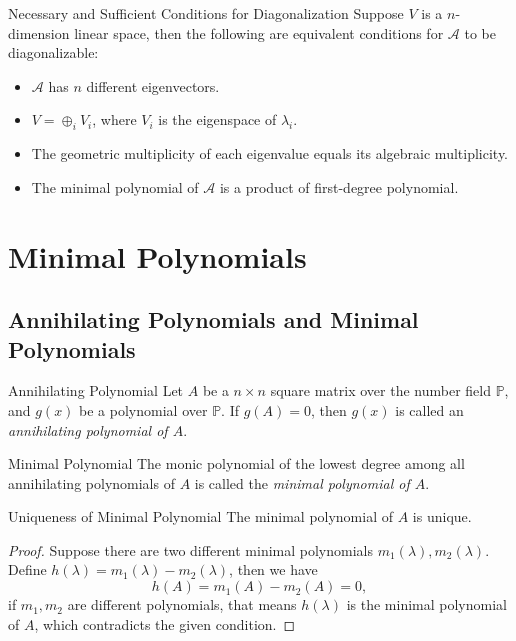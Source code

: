 \begin{proposition}{Necessary and Sufficient Conditions for Diagonalization}{}
  Suppose $V$ is a $n$-dimension linear space,
  then the following are equivalent conditions for $\mathcal{A}$ to be diagonalizable:
  \begin{itemize}
  \item $\mathcal{A}$ has $n$ different eigenvectors.
  \item $V = \oplus_i V_i$, where $V_i$ is the eigenspace of $\lambda_i$.
  \item The geometric multiplicity of each eigenvalue equals its algebraic multiplicity.
  \item The minimal polynomial of $\mathcal{A}$ is a product of first-degree polynomial.
  \end{itemize}
\end{proposition}

\section{Minimal Polynomials}

\subsection{Annihilating Polynomials and Minimal Polynomials}

\begin{definition}{Annihilating Polynomial}{}
  Let $A$ be a $n\times n$ square matrix over the number field $\mathbb{P}$,
  and $g(x)$ be a polynomial over $\mathbb{P}$.
  If $g(A) = 0$, then $g(x)$ is called an \emph{annihilating polynomial of $A$}.
\end{definition}

\begin{definition}{Minimal Polynomial}{}
  The monic polynomial of the lowest degree among all annihilating polynomials
  of $A$ is called the \emph{minimal polynomial of $A$}.
\end{definition}

\begin{proposition}{Uniqueness of Minimal Polynomial}{}
  The minimal polynomial of $A$ is unique.
\end{proposition}

\begin{proof}
  Suppose there are two different minimal polynomials $m_1(\lambda),
  m_2(\lambda)$.
  Define $h(\lambda) = m_1(\lambda) - m_2(\lambda)$,
  then we have
  \begin{equation}
    h(A) = m_1(A) - m_2(A) = 0,
  \end{equation}
  if $m_1, m_2$ are different polynomials, that means $h(\lambda)$ is the
  minimal polynomial of $A$, which contradicts the given condition.
\end{proof}

